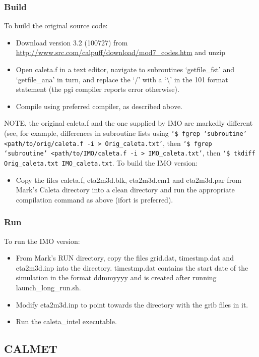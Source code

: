 \documentclass[10pt,a4paper]{article}
\begin{document}
\subsubsection{Build}
To build the original source code:
\begin{itemize}
\item Download version 3.2 (100727) from \url{http://www.src.com/calpuff/download/mod7_codes.htm} and unzip
\item Open caleta.f in a text editor, navigate to subroutines `getfile\_fst' and `getfile\_ana' in turn, and replace the `/' with a `\textbackslash' in the 101 format statement (the pgi compiler reports error otherwise).
\item Compile using preferred compiler, as described above.
\end{itemize}
NOTE, the original caleta.f and the one supplied by IMO are markedly different (see, for example, differences in subroutine lists using \texttt{`\$ fgrep `subroutine' <path/to/orig/caleta.f -i > Orig\_caleta.txt'}, then \texttt{`\$ fgrep `subroutine' <path/to/IMO/caleta.f -i > IMO\_caleta.txt'}, then \texttt{`\$ tkdiff Orig\_caleta.txt IMO\_caleta.txt}. To build the IMO version:
\begin{itemize}
\item Copy the files caleta.f, eta2m3d.blk, eta2m3d.cm1 and eta2m3d.par from Mark's Caleta directory into a clean directory and run the appropriate compilation command as above (ifort is preferred).
\end{itemize}

\subsubsection{Run}
To run the IMO version:
\begin{itemize}
\item From Mark's RUN directory, copy the files grid.dat, timestmp.dat and eta2m3d.inp into the directory. timestmp.dat contains the start date of the simulation in the format ddmmyyyy and is created after running launch\_long\_run.sh. 
\item Modify eta2m3d.inp to point towards the directory with the grib files in it.
\item Run the caleta\_intel executable.
\end{itemize}

\subsection{CALMET}
\end{document}
